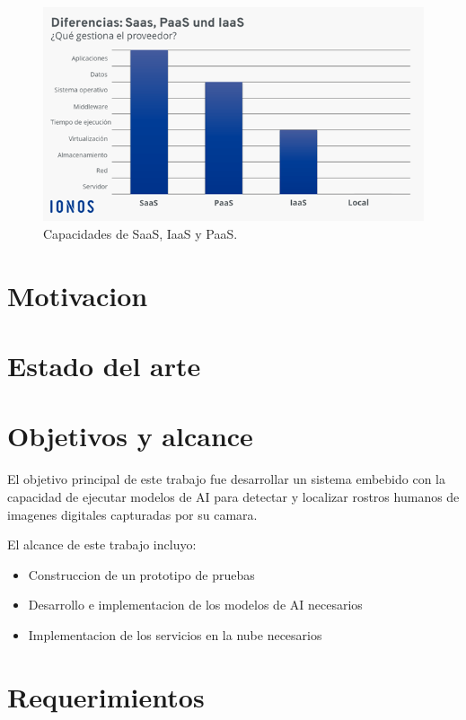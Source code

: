 \begin{figure}[h]
	\centering
	\includegraphics[scale=0.55]{./Figures/cloud_services.png}
	\caption{Capacidades de SaaS, IaaS y PaaS\protect\footnotemark.}
	\label{fig:cloud_services}
\end{figure}


\section{Motivacion}


\section{Estado del arte}

\section{Objetivos y alcance}
El objetivo principal de este trabajo fue desarrollar un sistema embebido con la capacidad de ejecutar modelos de AI para detectar y localizar rostros humanos de imagenes digitales capturadas por su camara.

El alcance de este trabajo incluyo:
\begin{itemize}
	\item Construccion de un prototipo de pruebas
	\item Desarrollo e implementacion de los modelos de AI necesarios
	\item Implementacion de los servicios en la nube necesarios
\end{itemize}
\section{Requerimientos}



